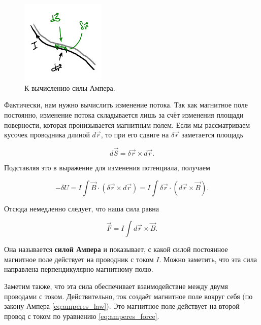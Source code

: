 \documentclass[11pt,a4paper]{article}
\numberwithin{equation}{section}
\begin{document}
\begin{figure}
  \vspace{-1.5cm}
  \begin{center}
  \includegraphics[width=4cm]{ampere.pdf}  
  \end{center}
  \vspace{-1cm}
  \caption{К вычислению силы Ампера.}
  \label{fig:amperes_force}
  \vspace{-1.1cm}
\end{figure}

Фактически, нам нужно вычислить изменение потока. Так как магнитное
поле постоянно, изменение потока складывается лишь за счёт изменения
площади поверности, которая пронизывается магнитным полем. Если мы
рассматриваем кусочек проводника длиной $d\vec{r}$, то при его сдвиге
на $\delta \vec{r}$ заметается площадь 

\begin{equation}
  \label{eq:der_amperes_force_2}
  d\vec{S} = \delta \vec{r} \times d \vec{r}.
\end{equation}

Подставляя это в выражение для изменения потенциала, получаем

\begin{equation}
  \label{eq:der_amperes_force_3}
  -\delta U = I \int \vec{B} \cdot \left( \delta  \vec{r}
    \times d \vec{r}\right) = I \int \delta \vec{r} \cdot (d\vec{r} \times \vec{B}).
\end{equation}

Отсюда немедленно следует, что наша сила равна 

\begin{equation}
  \label{eq:amperes_force}
  \vec{F} = I  \int d\vec{r} \times \vec{B}.
\end{equation}

Она называется \textbf{силой Ампера} и показывает, с какой силой
постоянное магнитное поле действует на проводник с током $I$. Можно
заметить, что эта сила направлена перпендикулярно магнитному полю.

Заметим также, что эта сила обеспечивает взаимодействие между двумя
проводами с током. Действительно, ток создаёт магнитное поле вокруг
себя (по закону Ампера \eqref{eq:amperes_law}). Это магнитное поле
действует на второй провод с током по уравнению
\eqref{eq:amperes_force}. 
\end{document}
